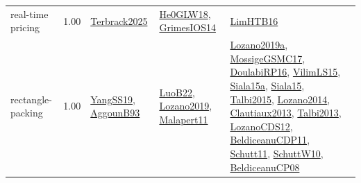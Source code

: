 {\begin{longtable}{p{3cm}r>{\raggedright\arraybackslash}p{6cm}>{\raggedright\arraybackslash}p{6cm}>{\raggedright\arraybackslash}p{8cm}}
\index{real-time pricing}\index{ApplicationAreas!real-time pricing}real-time pricing &  1.00 & \hyperref[detail:Terbrack2025]{Terbrack2025} & \hyperref[detail:He0GLW18]{He0GLW18}, \hyperref[detail:GrimesIOS14]{GrimesIOS14} & \hyperref[detail:LimHTB16]{LimHTB16}\\
\index{rectangle-packing}\index{ApplicationAreas!rectangle-packing}rectangle-packing &  1.00 & \hyperref[detail:YangSS19]{YangSS19}, \hyperref[detail:AggounB93]{AggounB93} & \hyperref[detail:LuoB22]{LuoB22}, \hyperref[detail:Lozano2019]{Lozano2019}, \hyperref[detail:Malapert11]{Malapert11} & \hyperref[detail:Lozano2019a]{Lozano2019a}, \hyperref[detail:MossigeGSMC17]{MossigeGSMC17}, \hyperref[detail:DoulabiRP16]{DoulabiRP16}, \hyperref[detail:VilimLS15]{VilimLS15}, \hyperref[detail:Siala15a]{Siala15a}, \hyperref[detail:Siala15]{Siala15}, \hyperref[detail:Talbi2015]{Talbi2015}, \hyperref[detail:Lozano2014]{Lozano2014}, \hyperref[detail:Clautiaux2013]{Clautiaux2013}, \hyperref[detail:Talbi2013]{Talbi2013}, \hyperref[detail:LozanoCDS12]{LozanoCDS12}, \hyperref[detail:BeldiceanuCDP11]{BeldiceanuCDP11}, \hyperref[detail:Schutt11]{Schutt11}, \hyperref[detail:SchuttW10]{SchuttW10}, \hyperref[detail:BeldiceanuCP08]{BeldiceanuCP08}\\

\end{longtable}}
